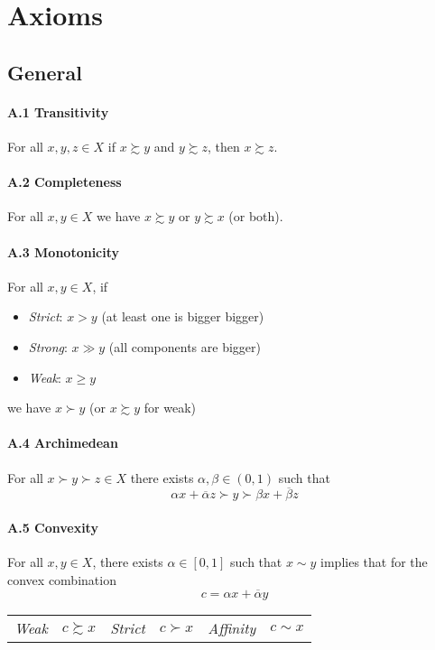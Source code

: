 \documentclass[landscape, 12pt]{extarticle}
\begin{document}
\clearpage

\section{Axioms}

\begin{multicols}{2}
	\subsection{General}

	\paragraph{A.1 Transitivity}
	For all $x, y, z \in X$ if $x \succsim y$ and $y \succsim z$, then $x \succsim z$.

	\paragraph{A.2 Completeness}
	For all $x, y \in X$ we have $x \succsim y$ or $y \succsim x$ (or both).

	\paragraph{A.3 Monotonicity}
	For all $x, y \in X$, if
	\begin{itemize}
		\item \textit{Strict}: $x>y$ (at least one is bigger bigger)
		\item \textit{Strong}: $x \gg y$ (all components are bigger)
		\item \textit{Weak}: $x \geq y$
	\end{itemize}
	we have $x \succ y$ (or $x\succsim y$ for weak)

	\paragraph{A.4 Archimedean}
	For all $x \succ y \succ z \in X$ there exists $\alpha, \beta \in (0, 1)$ such that
	\[
		\alpha x + \overline \alpha z \succ y \succ \beta x + \overline \beta z
	\]

	\paragraph{A.5 Convexity}
	For all $x, y \in X$, there exists $\alpha \in [0, 1]$ such that $x \sim y$ implies
	that for the convex combination
	\[
		c = \alpha x + \overline \alpha y
	\]
	\begin{center}
		\begin{tabular}{cc|cc|cc}
			\textit{Weak}     & $c \succsim x$ &
			\textit{Strict}   & $c \succ x$    &
			\textit{Affinity} & $c \sim x$       \\
		\end{tabular}
	\end{center}


\end{multicols}
\end{document}
